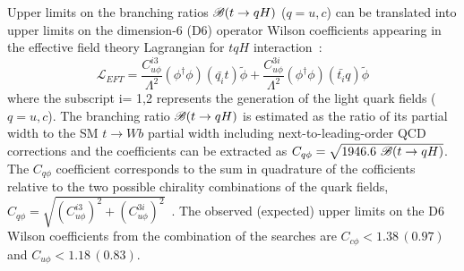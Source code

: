 Upper limits on the branching ratios $\mathscr{B}(t\to qH)$ ($q=u,c$) can be translated into upper limits on the dimension-6 (D6) operator Wilson coefficients appearing in the effective field theory Lagrangian for $tqH$ interaction~\cite{fcnc_production_theory}:
%
\begin{equation}
  \mathcal{L}_{EFT} = \frac{C^{i3}_{u\phi}}{\Lambda^{2}}(\phi^{\dagger}\phi)(\bar{q_{i}}t)\tilde{\phi} + \frac{C^{3i}_{u\phi}}{\Lambda^{2}}(\phi^{\dagger}\phi)(\bar{t_{i}}q)\tilde{\phi}
  \label{eq:eq01}
\end{equation}
%
where the subscript i= 1,2 represents the generation of the light quark fields ($q=u,c$).
The branching ratio $\mathscr{B}(t\to qH)$ is estimated as the ratio of its partial width to the SM $t \to Wb$ partial width including next-to-leading-order QCD corrections and the coefficients can be extracted as $C_{q\phi} = \sqrt{1946.6~\mathscr{B}(t\to qH)}$. The $C_{q\phi}$ coefficient corresponds to the sum in quadrature of the cofficients relative to the two possible chirality combinations of the quark fields,
$C_{q\phi} =\sqrt{(C^{i3}_{u\phi})^2 + (C^{3i}_{u\phi})^2}$~\cite{fcnc_production_theory}. The observed (expected) upper limits on the D6 Wilson coefficients from the combination of the searches are $C_{c\phi}<1.38\,(0.97)$ and $C_{u\phi}<1.18\,(0.83)$. 


